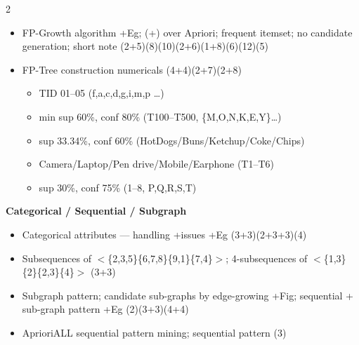 \documentclass[10pt]{article}
\begin{document}
\begin{multicols}{2}
\begin{itemize}
  \item FP-Growth algorithm +Eg; (+) over Apriori; frequent itemset; no candidate generation; short note \hfill (2+5)(8)(10)(2+6)(1+8)(6)(12)(5)
  \item FP-Tree construction numericals \hfill (4+4)(2+7)(2+8)
    \begin{itemize}
      \item TID 01--05 (f,a,c,d,g,i,m,p \dots)
      \item min sup 60\%, conf 80\% (T100--T500, \{M,O,N,K,E,Y\}\dots)
      \item sup 33.34\%, conf 60\% (HotDogs/Buns/Ketchup/Coke/Chips)
      \item Camera/Laptop/Pen drive/Mobile/Earphone (T1--T6)
      \item sup 30\%, conf 75\% (1--8, P,Q,R,S,T)
    \end{itemize}
\end{itemize}
\textbf{Categorical / Sequential / Subgraph}
\begin{itemize}
  \item Categorical attributes --- handling +issues +Eg \hfill (3+3)(2+3+3)(4)
  \item Subsequences of $<$\{2,3,5\}\{6,7,8\}\{9,1\}\{7,4\}$>$; 4-subsequences of $<$\{1,3\}\{2\}\{2,3\}\{4\}$>$ \hfill (3+3)
  \item Subgraph pattern; candidate sub-graphs by edge-growing +Fig; sequential + sub-graph pattern +Eg \hfill (2)(3+3)(4+4)
  \item AprioriALL sequential pattern mining; sequential pattern \hfill (3)
\end{itemize}


\end{multicols}
\end{document}
